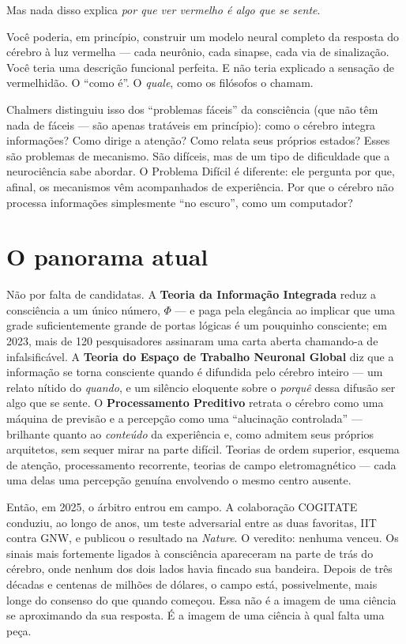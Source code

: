 \documentclass[11pt, twoside, openright]{book}
\begin{document}
Mas nada disso explica \textit{por que ver vermelho é algo que se sente}.

Você poderia, em princípio, construir um modelo neural completo da resposta do cérebro à luz vermelha --- cada neurônio, cada sinapse, cada via de sinalização. Você teria uma descrição funcional perfeita. E não teria explicado a sensação de vermelhidão. O ``como é''. O \textit{quale}, como os filósofos o chamam.

Chalmers distinguiu isso dos ``problemas fáceis'' da consciência (que não têm nada de fáceis --- são apenas tratáveis em princípio): como o cérebro integra informações? Como dirige a atenção? Como relata seus próprios estados? Esses são problemas de mecanismo. São difíceis, mas de um tipo de dificuldade que a neurociência sabe abordar. O Problema Difícil é diferente: ele pergunta por que, afinal, os mecanismos vêm acompanhados de experiência. Por que o cérebro não processa informações simplesmente ``no escuro'', como um computador?

\section*{O panorama atual}

Não por falta de candidatas. A \textbf{Teoria da Informação Integrada} reduz a consciência a um único número, $\Phi$ --- e paga pela elegância ao implicar que uma grade suficientemente grande de portas lógicas é um pouquinho consciente; em 2023, mais de 120 pesquisadores assinaram uma carta aberta chamando-a de infalsificável. A \textbf{Teoria do Espaço de Trabalho Neuronal Global} diz que a informação se torna consciente quando é difundida pelo cérebro inteiro --- um relato nítido do \textit{quando}, e um silêncio eloquente sobre o \textit{porquê} dessa difusão ser algo que se sente. O \textbf{Processamento Preditivo} retrata o cérebro como uma máquina de previsão e a percepção como uma ``alucinação controlada'' --- brilhante quanto ao \textit{conteúdo} da experiência e, como admitem seus próprios arquitetos, sem sequer mirar na parte difícil. Teorias de ordem superior, esquema de atenção, processamento recorrente, teorias de campo eletromagnético --- cada uma delas uma percepção genuína envolvendo o mesmo centro ausente.

Então, em 2025, o árbitro entrou em campo. A colaboração COGITATE conduziu, ao longo de anos, um teste adversarial entre as duas favoritas, IIT contra GNW, e publicou o resultado na \textit{Nature}. O veredito: nenhuma venceu. Os sinais mais fortemente ligados à consciência apareceram na parte de trás do cérebro, onde nenhum dos dois lados havia fincado sua bandeira. Depois de três décadas e centenas de milhões de dólares, o campo está, possivelmente, mais longe do consenso do que quando começou. Essa não é a imagem de uma ciência se aproximando da sua resposta. É a imagem de uma ciência à qual falta uma peça.
\end{document}
